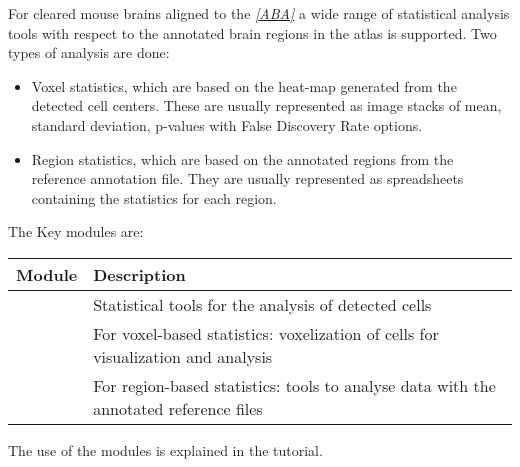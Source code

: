 \documentclass[letterpaper,10pt,english]{sphinxmanual}
\begin{document}
For cleared mouse brains aligned to the \label{introduction:id5}{\hyperref[introduction:aba]{\emph{{[}ABA{]}}}} a wide range of statistical
analysis tools with respect to the annotated brain regions in the atlas is
supported. Two types of analysis are done:
\begin{itemize}
\item {} 
Voxel statistics, which are based on the heat-map generated from the detected cell centers. These are usually represented as image stacks of mean, standard deviation, p-values with False Discovery Rate options.

\item {} 
Region statistics, which are based on the annotated regions from the reference annotation file. They are usually represented as spreadsheets containing the statistics for each region.

\end{itemize}

The Key modules are:

\begin{tabulary}{\linewidth}{|L|L|}
\hline
\textsf{\relax 
Module
} & \textsf{\relax 
Description
}\\
\hline
{\hyperref[api/ClearMap.Analysis:module-ClearMap.Analysis.Statistics]{\emph{}}}
 & 
Statistical tools for the analysis of detected cells
\\
\hline
{}
 & 
For voxel-based statistics: voxelization of cells for visualization and analysis
\\
\hline
{\hyperref[api/ClearMap.Analysis:module-ClearMap.Analysis.Label]{\emph{}}}
 & 
For region-based statistics: tools to analyse data with the annotated reference files
\\
\hline\end{tabulary}


The use of the modules is explained in the tutorial.
\end{document}
